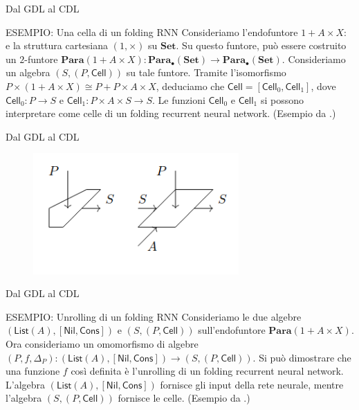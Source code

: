 \documentclass{beamer}
\begin{document}
\begin{frame}{Dal GDL al CDL}
    \begin{block}{ESEMPIO: Una cella di un folding RNN}
        Consideriamo l'endofuntore $1 + A \times X:$ e la struttura cartesiana $(1, \times)$ su $\mathbf{Set}$. Su questo funtore, può essere costruito un $2$-funtore $\mathbf{Para}(1 + A \times X): \mathbf{Para}_{\bullet}(\mathbf{Set}) \to \mathbf{Para}_{\bullet}(\mathbf{Set})$. Consideriamo un algebra $(S,(P,\mathsf{Cell}))$ su tale funtore. Tramite l'isomorfismo $P \times (1 + A \times X) \cong P + P \times A \times X$, deduciamo che $\mathsf{Cell} = [\mathsf{Cell}_0, \mathsf{Cell}_1]$, dove $\mathsf{Cell}_0: P \to S$ e  $\mathsf{Cell}_1: P \times A \times S \to S$. Le funzioni $\mathsf{Cell}_0$ e $\mathsf{Cell}_1$ si possono interpretare come celle di un folding recurrent neural network. (Esempio da \cite{gavranovicposition}.)
    \end{block}
\end{frame}

\begin{frame}{Dal GDL al CDL}
    \begin{figure}
        \begin{center}
            \includegraphics[width=0.7\textwidth]{figures/folding_rnn_cell.png}
            \caption*{\cite{gavranovicposition}}
        \end{center}
    \end{figure}
\end{frame}

\begin{frame}{Dal GDL al CDL}
    \begin{block}{ESEMPIO: Unrolling di un folding RNN}
        Consideriamo le due algebre $(\mathsf{List}(A), [\mathsf{Nil}, \mathsf{Cons}])$ e $(S,(P,\mathsf{Cell}))$ sull'endofuntore $\mathbf{Para}(1 + A \times X)$.
        Ora consideriamo un omomorfismo di algebre $(P,f,\Delta_P): (\mathsf{List}(A), [\mathsf{Nil}, \mathsf{Cons}]) \to (S,(P,\mathsf{Cell}))$. Si può dimostrare che una funzione $f$ così definita è l'unrolling di un folding recurrent neural network. L'algebra $(\mathsf{List}(A), [\mathsf{Nil}, \mathsf{Cons}])$ fornisce gli input della rete neurale, mentre l'algebra $(S,(P,\mathsf{Cell}))$ fornisce le celle. (Esempio da \cite{gavranovicposition}.)
    \end{block}
\end{frame}
\end{document}
